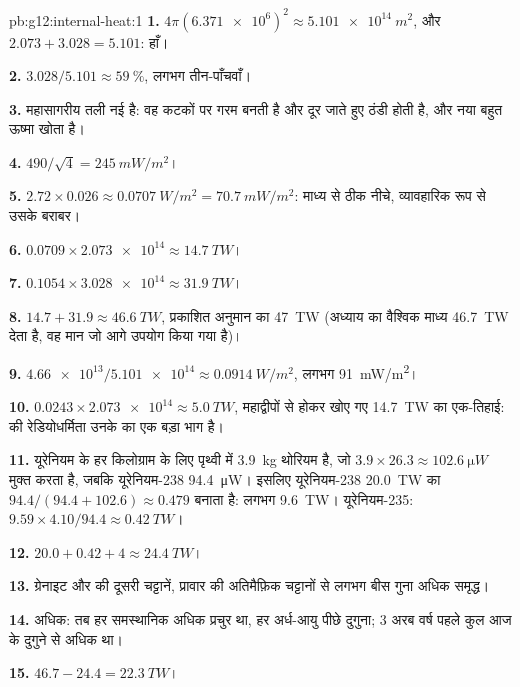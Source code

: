 \begin{solution}{pb:g12:internal-heat:1}
\textbf{1.} $4\pi (\num{6.371e6})^2 \approx \qty{5.101e14}{m^2}$, और
$2.073 + 3.028 = 5.101$: हाँ।

\textbf{2.} $3.028/5.101 \approx \qty{59}{\percent}$, लगभग तीन-पाँचवाँ।

\textbf{3.} महासागरीय तली नई है: वह कटकों पर गरम बनती है और
दूर जाते हुए ठंडी होती है, और नया  बहुत ऊष्मा खोता है।

\textbf{4.} $490/\sqrt{4} = \qty{245}{mW/m^2}$।

\textbf{5.} $2.72 \times 0.026 \approx \qty{0.0707}{W/m^2} =
\qty{70.7}{mW/m^2}$: माध्य से ठीक नीचे, व्यावहारिक रूप से उसके बराबर।

\textbf{6.} $0.0709 \times \num{2.073e14} \approx \qty{14.7}{TW}$।

\textbf{7.} $0.1054 \times \num{3.028e14} \approx \qty{31.9}{TW}$।

\textbf{8.} $14.7 + 31.9 \approx \qty{46.6}{TW}$, प्रकाशित अनुमान का
\qty{47}{TW} (अध्याय का वैश्विक माध्य \qty{46.7}{TW} देता है, वह
मान जो आगे उपयोग किया गया है)।

\textbf{9.} $\num{4.66e13}/\num{5.101e14} \approx \qty{0.0914}{W/m^2}$,
लगभग \qty{91}{mW/m^2}।

\textbf{10.} $0.0243 \times \num{2.073e14} \approx \qty{5.0}{TW}$, महाद्वीपों से होकर
खोए गए \qty{14.7}{TW} का एक-तिहाई:  की
रेडियोधर्मिता उनके  का एक बड़ा भाग है।

\textbf{11.} यूरेनियम के हर किलोग्राम के लिए पृथ्वी में \qty{3.9}{kg}
थोरियम है, जो $3.9 \times 26.3 \approx \qty{102.6}{\micro W}$ मुक्त करता है,
जबकि यूरेनियम-238 \qty{94.4}{\micro W}। इसलिए यूरेनियम-238
\qty{20.0}{TW} का $94.4/(94.4 + 102.6) \approx 0.479$ बनाता है: लगभग
\qty{9.6}{TW}। यूरेनियम-235: $9.59 \times 4.10/94.4 \approx \qty{0.42}{TW}$।

\textbf{12.} $20.0 + 0.42 + 4 \approx \qty{24.4}{TW}$।

\textbf{13.} ग्रेनाइट और  की दूसरी चट्टानें, प्रावार की अतिमैफ़िक
चट्टानों से लगभग बीस गुना अधिक समृद्ध।

\textbf{14.} अधिक: तब हर समस्थानिक अधिक प्रचुर था, हर अर्ध-आयु पीछे
दुगुना; 3 अरब वर्ष पहले कुल आज के दुगुने से
अधिक था।

\textbf{15.} $46.7 - 24.4 = \qty{22.3}{TW}$।


\end{solution}

